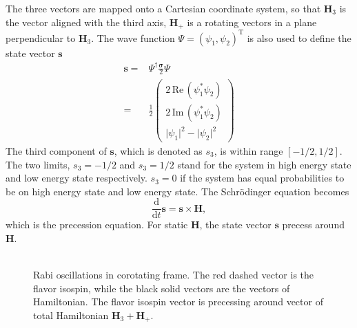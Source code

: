 The three vectors are mapped onto a Cartesian coordinate system, so that $\mathbf{H}_3$ is the vector aligned with the third axis, $\mathbf{H}_+$ is a rotating vectors in a plane perpendicular to $\mathbf{H}_3$. The wave function $\Psi=(\psi_1,\psi_2)^{\mathrm{T}}$ is also used to define the state vector $\mathbf{s}$
\begin{align}
    \mathbf{s} =& \Psi^\dagger \frac{\boldsymbol{\sigma}}{2}\Psi \\
    =& \frac{1}{2}\begin{pmatrix}
    2\,\mathrm{Re}\,(\psi_1^* \psi_2) \\
    2\,\mathrm{Im}\,(\psi_1^*\psi_2) \\
    \lvert \psi_1 \rvert^2 - \lvert \psi_2 \rvert^2
    \end{pmatrix}
\end{align}
The third component of $\mathbf{s}$, which is denoted as $s_3$, is within range $[-1/2,1/2]$. The two limits, $s_3=-1/2$ and $s_3=1/2$ stand for the system in high energy state and low energy state respectively. $s_3=0$ if the system has equal probabilities to be on high energy state and low energy state. The Schr\"odinger equation becomes
\begin{equation}
\frac{\mathrm{d}}{\mathrm{d} t } \mathbf{s} = \mathbf{s} \times \mathbf{H},
\end{equation}
which is the precession equation. For static $\mathbf{H}$, the state vector $\mathbf{s}$ precess around $\mathbf{H}$.

\begin{figure}[htbp]
        \centering
        \includegraphics[width=\columnwidth, trim={20cm 10cm 50cm 10cm},clip]{chapters/assets/rabi/rabi-isospin-rotating-frame}
    \caption{Rabi oscillations in corotating frame. The red dashed vector is the flavor isospin, while the black solid vectors are the vectors of Hamiltonian. The flavor isospin vector is precessing around vector of total Hamiltonian $\mathbf{H}_3+\mathbf{H}_+$.}
    \label{fig-rabi-isospin-rotating-frame}
\end{figure}

